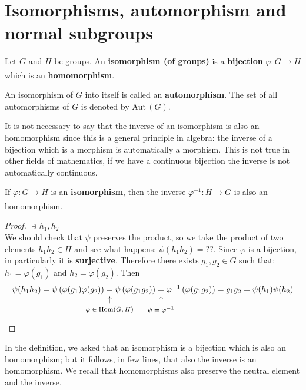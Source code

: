 \documentclass[../main.tex]{subfiles}
\begin{document}
\section{Isomorphisms, automorphism and normal subgroups}
\begin{definition}
Let $G$ and $H$ be groups. An \textbf{isomorphism (of groups)} is a \underline{\textbf{bijection}}  $\varphi:G\xrightarrow[]{}H$ which is an \textbf{homomorphism}.

An isomorphism of $G$ into itself is called an \textbf{automorphism}. The set of all automorphisms of $G$ is denoted by $\text{Aut}\,(G)$.
\end{definition}
It is not necessary to say that the inverse of an isomorphism is also an homomorphism since this is a general principle in algebra: the inverse of a bijection which is a morphism is automatically a morphism. This is not true in other fields of mathematics, if we have a continuous bijection the inverse is not automatically continuous.
\begin{lemma}
If $\varphi:G\xrightarrow[]{}H$ is an \textbf{isomorphism}, then the inverse $\varphi^{-1}:H\xrightarrow[]{}G$ is also an homomorphism.
\end{lemma}
\begin{proof}
{{\color{red}$\ni h_1,h_2$}}\\
We should check that $\psi$ preserves the product, so we take the product of two elements $h_1h_2\in H$ and see what happens: $\psi(h_1h_2)=??$. Since $\varphi$ is a bijection, in particularly it is \textbf{surjective}. Therefore there exists $g_1,g_2\in G$ such that: $h_1=\varphi(g_1)$ and $h_2=\varphi(g_2)$. Then
\[
\psi(h_1h_2)=\psi\left(\varphi(g_1)\varphi(g_2)\right)\underset{\mathclap{\tikz \node {$\uparrow$} node [below=1ex] {\footnotesize $\varphi\in\text{Hom}(G,H)$ };}}=\psi\left(\varphi(g_1 g_2)\right)\underset{\mathclap{\tikz \node {$\uparrow$} node [below=1ex] {\footnotesize $\psi=\varphi^{-1}$ };}}=\varphi^{-1}\left(\varphi(g_1 g_2)\right)=g_1 g_2=\psi(h_1)\psi(h_2)
\]
\end{proof}
In the definition, we asked that an isomorphism is a bijection which is also an homomorphism; but it follows, in few lines, that also the inverse is an homomorphism. We recall that homomorphisms also preserve the neutral element and the inverse.
\end{document}

